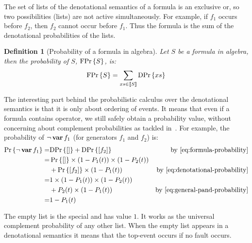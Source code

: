 \documentclass[12pt,openright,twoside,a4paper,oldfontcommands,english,brazil,final]{abntex2}
\newtheorem{definition}{Definition}[chapter]
\theoremstyle{theo}
\def\varop{\ensuremath\operatorname{\mathbf{var}}}
\newcommand{\var}[1]{\ensuremath\varop #1}
\def\probabilityop{\ensuremath \Pr}
\newcommand{\probability}[1]{\ensuremath \probabilityop\left\{#1\right\}}
\def\denotationalprobop{\ensuremath\mathrm{DPr}}
\newcommand{\denotationalprob}[1]{\ensuremath \denotationalprobop\left\{#1\right\}}
\def\formulaprobop{\ensuremath\mathrm{FPr}}
\newcommand{\formulaprob}[1]{\ensuremath \formulaprobop\left\{#1\right\}}
\newcommand{\denote}[1]{\ensuremath\left[\!\left[#1\right]\!\right]}
\begin{document}
The set of lists of the denotational semantics of a formula is an exclusive or, so two possibilities (lists) are not active simultaneously.
For example, if $f_1$ occurs before $f_2$, then $f_2$ cannot occur before $f_1$.
Thus the formula is the sum of the denotational probabilities of the lists.

\begin{definition}[Probability of a formula in \ac{algebra}]
Let $S$ be a formula in \ac{algebra}, then the probability of $S$, $\formulaprob{S}$, is:
%
\begin{equation}
\label{eq:formula-probability}
\formulaprob{S} = \sum_{xs \in \denote{S}}\denotationalprob{xs}
\end{equation}
\end{definition}

The interesting part behind the probabilistic calculus over the denotational semantics is that it is only about ordering of events.
It means that even if a formula contains  operator, we still safely obtain a probability value, without concerning about complement probabilities as tackled in~\cite{Andrews2001}.
For example, the probability of $\lnot \var{f_1}$ (for generators $f_1$ and $f_2$) is:
%
\begin{align}
\probability{\lnot \var{f_1}} = & \denotationalprob{\left[\right]} + \denotationalprob{\left[f_2\right]} & \text{by \cref{eq:formula-probability}} \nonumber\\
= &\probability{\left[\right]}\times\left(1 - P_1(t)\right)\times\left(1 - P_2(t)\right)\nonumber\\
& + \probability{\left[f_2\right]}\times\left(1 - P_1(t)\right) & \text{by \cref{eq:denotational-probability}} \nonumber\\
= & 1 \times \left(1- P_1(t)\right) \times \left(1 - P_2(t)\right)\nonumber\\
& + P_2(t) \times \left(1 - P_1(t)\right) & \text{by \cref{eq:general-pand-probability}}\nonumber\\
= & 1 - P_1(t)
\end{align}

The empty list is the special and has value $1$.
It works as the universal complement probability of any other list.
When the empty list appears in a denotational semantics it means that the top-event occurs if no fault occurs.
\end{document}
